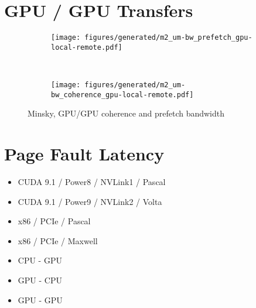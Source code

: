 \section{GPU / GPU Transfers}

\begin{figure}[ht]
    \centering
    \begin{subfigure}[b]{0.45\textwidth}
        \texttt{[image: figures/generated/m2\_um-bw\_prefetch\_gpu-local-remote.pdf]}
        \caption{}
        \label{fig:minsky-topo-hardware}
    \end{subfigure}
    ~
    \begin{subfigure}[b]{0.45\textwidth}
        \texttt{[image: figures/generated/m2\_um-bw\_coherence\_gpu-local-remote.pdf]}
        \caption{}
        \label{fig:minsky-topo-cuda-simple}
    \end{subfigure}
    \caption[]{Minsky, GPU/GPU coherence and prefetch bandwidth}
    \label{fig:minsky-hardware-logical}
\end{figure}


\section{Page Fault Latency}

\begin{itemize}
    \item CUDA 9.1 / Power8 / NVLink1 / Pascal
    \item CUDA 9.1 / Power9 / NVLink2 / Volta
    \item x86 / PCIe / Pascal
    \item x86 / PCIe / Maxwell
\end{itemize}

\begin{itemize}
    \item CPU - GPU
    \item GPU - CPU
    \item GPU - GPU
\end{itemize}